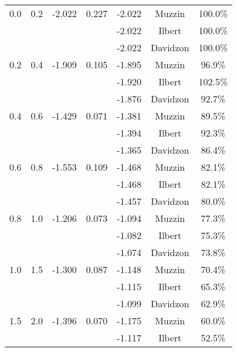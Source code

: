 \begin{table}
\begin{center}
\begin{tabular}{ c c c c c c c }
            0.0 &     0.2 &  -2.022 &   0.227 &  -2.022 &       Muzzin &        100.0\% \\ 
            \multicolumn{4}{c}{}              &  -2.022 &       Ilbert &        100.0\% \\ 
            \multicolumn{4}{c}{}              &  -2.022 &     Davidzon &        100.0\% \\ 
            0.2 &     0.4 &  -1.909 &   0.105 &  -1.895 &       Muzzin &         96.9\% \\ 
            \multicolumn{4}{c}{}              &  -1.920 &       Ilbert &        102.5\% \\ 
            \multicolumn{4}{c}{}              &  -1.876 &     Davidzon &         92.7\% \\ 
            0.4 &     0.6 &  -1.429 &   0.071 &  -1.381 &       Muzzin &         89.5\% \\ 
            \multicolumn{4}{c}{}              &  -1.394 &       Ilbert &         92.3\% \\ 
            \multicolumn{4}{c}{}              &  -1.365 &     Davidzon &         86.4\% \\ 
            0.6 &     0.8 &  -1.553 &   0.109 &  -1.468 &       Muzzin &         82.1\% \\ 
            \multicolumn{4}{c}{}              &  -1.468 &       Ilbert &         82.1\% \\ 
            \multicolumn{4}{c}{}              &  -1.457 &     Davidzon &         80.0\% \\ 
            0.8 &     1.0 &  -1.206 &   0.073 &  -1.094 &       Muzzin &         77.3\% \\ 
            \multicolumn{4}{c}{}              &  -1.082 &       Ilbert &         75.3\% \\ 
            \multicolumn{4}{c}{}              &  -1.074 &     Davidzon &         73.8\% \\ 
            1.0 &     1.5 &  -1.300 &   0.087 &  -1.148 &       Muzzin &         70.4\% \\ 
            \multicolumn{4}{c}{}              &  -1.115 &       Ilbert &         65.3\% \\ 
            \multicolumn{4}{c}{}              &  -1.099 &     Davidzon &         62.9\% \\ 
            1.5 &     2.0 &  -1.396 &   0.070 &  -1.175 &       Muzzin &         60.0\% \\ 
            \multicolumn{4}{c}{}              &  -1.117 &       Ilbert &         52.5\% \\ 

\end{tabular}
\end{center}
\end{table}
